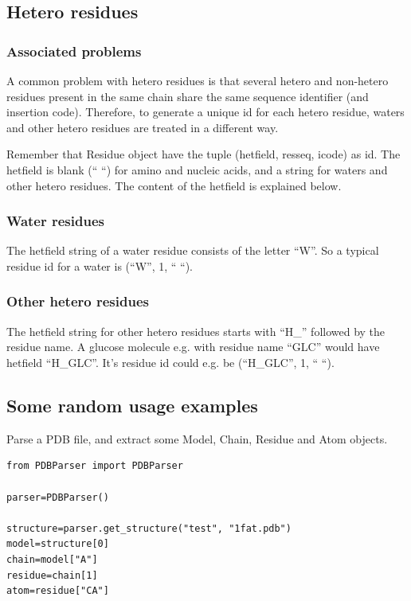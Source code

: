 \documentclass{report}
\begin{document}
\subsection{Hetero residues}


\subsubsection{Associated problems\label{hetero probems}}

A common problem with hetero residues is that several hetero and non-hetero
residues present in the same chain share the same sequence identifier (and insertion
code). Therefore, to generate a unique id for each hetero residue, waters and
other hetero residues are treated in a different way. 

Remember that Residue object have the tuple (hetfield, resseq, icode) as id.
The hetfield is blank ({}`` {}``) for amino and nucleic acids, and a string
for waters and other hetero residues. The content of the hetfield is explained
below.

\subsubsection{Water residues}

The hetfield string of a water residue consists of the letter {}``W{}''. So
a typical residue id for a water is ({}``W{}'', 1, {}`` {}``).

\subsubsection{Other hetero residues}

The hetfield string for other hetero residues starts with {}``H\_{}'' followed
by the residue name. A glucose molecule e.g. with residue name {}``GLC{}''
would have hetfield {}``H\_GLC{}''. It's residue id could e.g. be ({}``H\_GLC{}'',
1, {}`` {}``).

\subsection{Some random usage examples}

Parse a PDB file, and extract some Model, Chain, Residue and Atom objects.

\begin{verbatim}
from PDBParser import PDBParser 

parser=PDBParser()

structure=parser.get_structure("test", "1fat.pdb")
model=structure[0]
chain=model["A"]
residue=chain[1]
atom=residue["CA"]
\end{verbatim}
\end{document}
